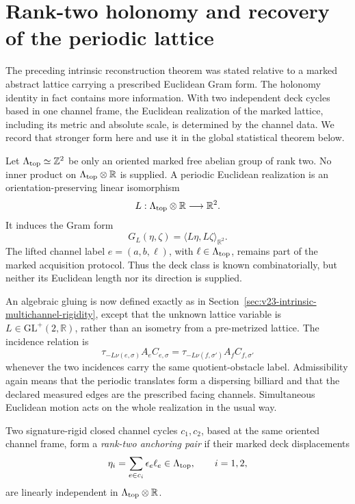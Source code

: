 \section{Rank-two holonomy and recovery of the periodic lattice}
\label{sec:v24-rank-two-lattice}

The preceding intrinsic reconstruction theorem was stated relative to a marked
abstract lattice carrying a prescribed Euclidean Gram form.  The holonomy
identity in fact contains more information.  With two independent deck
cycles based in one channel frame, the Euclidean realization of the marked
lattice, including its metric and absolute scale, is determined by the
channel data.  We record that stronger form here and use it in the global
statistical theorem below.

Let \(\Lambda_{\rm top}\simeq\mathbb Z^2\) be only an oriented marked free
abelian group of rank two.  No inner product on
\(\Lambda_{\rm top}\otimes\mathbb R\) is supplied.  A periodic Euclidean
realization is an orientation-preserving linear isomorphism
\[
 L:\Lambda_{\rm top}\otimes\mathbb R\longrightarrow\mathbb R^2.
\]
It induces the Gram form
\begin{equation}\label{eq:v24-recovered-gram}
 G_L(\eta,\zeta)=\langle L\eta,L\zeta\rangle_{\mathbb R^2}.
\end{equation}
The lifted channel label \(e=(a,b,\ell)\), with
\(\ell\in\Lambda_{\rm top}\), remains part of the marked acquisition
protocol.  Thus the deck class is known combinatorially, but neither its
Euclidean length nor its direction is supplied.

An algebraic gluing is now defined exactly as in
Section~\ref{sec:v23-intrinsic-multichannel-rigidity}, except that the unknown
lattice variable is \(L\in\mathrm{GL}^+(2,\mathbb R)\), rather than an
isometry from a pre-metrized lattice.  The incidence relation is
\begin{equation}\label{eq:v24-unmetrized-gluing}
 \tau_{-L\nu(e,\sigma)}A_eC_{e,\sigma}
 =\tau_{-L\nu(f,\sigma')}A_fC_{f,\sigma'}
\end{equation}
whenever the two incidences carry the same quotient-obstacle label.
Admissibility again means that the periodic translates form a dispersing
billiard and that the declared measured edges are the prescribed facing
channels.  Simultaneous Euclidean motion acts on the whole realization in the
usual way.

\begin{definition}
\label{def:v24-rank-two-anchoring}
Two signature-rigid closed channel cycles \(c_1,c_2\), based at the same
oriented channel frame, form a \emph{rank-two anchoring pair} if their marked
deck displacements
\[
 \eta_i=\sum_{e\in c_i}\epsilon_e\ell_e\in\Lambda_{\rm top},
 \qquad i=1,2,
\]
are linearly independent in \(\Lambda_{\rm top}\otimes\mathbb R\).
\end{definition}


